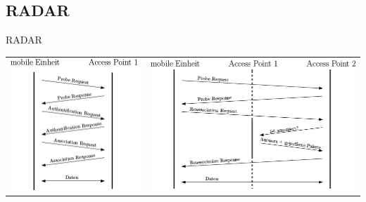 \documentclass[18pt]{beamer}
\begin{document}
\subsection{RADAR}
\begin{frame}{RADAR}
	\begin{tabular}{cc}
		\includegraphics[height=0.5\textheight]{images/reupper.png} & \includegraphics[height=0.5\textheight]{images/relower.png}\\
	\end{tabular}
\end{frame}
\end{document}
